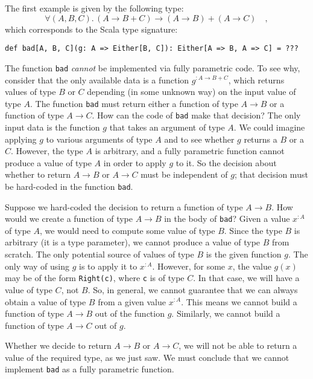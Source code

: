 The first example is given by the following type:
\begin{equation}
\forall(A,B,C).\,\left(A\rightarrow B+C\right)\rightarrow\left(A\rightarrow B\right)+\left(A\rightarrow C\right)\quad,\label{eq:ch-example-boolean-bad-type}
\end{equation}
which corresponds to the Scala type signature:
\begin{lstlisting}
def bad[A, B, C](g: A => Either[B, C]): Either[A => B, A => C] = ???
\end{lstlisting}
The function \lstinline!bad! \emph{cannot} be implemented via fully
parametric code. To see why, consider that the only available data
is a function $g^{:A\rightarrow B+C}$, which returns values of type
$B$ or $C$ depending (in some unknown way) on the input value of
type $A$. The function \lstinline!bad! must return either a function
of type $A\rightarrow B$ or a function of type $A\rightarrow C$.
How can the code of \lstinline!bad! make that decision? The only
input data is the function $g$ that takes an argument of type $A$.
We could imagine applying $g$ to various arguments of type $A$ and
to see whether $g$ returns a $B$ or a $C$. However, the type $A$
is arbitrary, and a fully parametric function cannot produce a value
of type $A$ in order to apply $g$ to it. So the decision about whether
to return $A\rightarrow B$ or $A\rightarrow C$ must be independent
of $g$; that decision must be hard-coded in the function \lstinline!bad!.

Suppose we hard-coded the decision to return a function of type $A\rightarrow B$.
How would we create a function of type $A\rightarrow B$ in the body
of \lstinline!bad!? Given a value $x^{:A}$ of type $A$, we would
need to compute some value of type $B$. Since the type $B$ is arbitrary
(it is a type parameter), we cannot produce a value of type $B$ from
scratch. The only potential source of values of type $B$ is the given
function $g$. The only way of using $g$ is to apply it to $x^{:A}$.
However, for some $x$, the value $g(x)$ may be of the form \lstinline!Right(c)!,
where \lstinline!c! is of type $C$. In that case, we will have a
value of type $C$, not $B$. So, in general, we cannot guarantee
that we can always obtain a value of type $B$ from a given value
$x^{:A}$. This means we cannot build a function of type $A\rightarrow B$
out of the function $g$. Similarly, we cannot build a function of
type $A\rightarrow C$ out of $g$. 

Whether we decide to return $A\rightarrow B$ or $A\rightarrow C$,
we will not be able to return a value of the required type, as we
just saw. We must conclude that we cannot implement \lstinline!bad!
as a fully parametric function.

